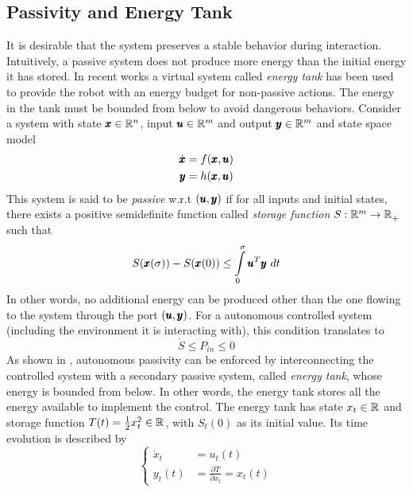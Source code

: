 \subsection{Passivity and Energy Tank}
It is desirable that the system preserves a stable behavior during interaction. Intuitively, a passive system does not produce more energy than the initial energy it has stored. In recent works \cite{shahriari2018valve} a virtual system called \emph{energy tank} has been used to provide the robot with an energy budget for non-passive actions. The energy in the tank must be bounded from below to avoid dangerous behaviors. Consider a system with state $\pmb{x} \in \mathbb{R}^{n}$, input $\pmb{u} \in \mathbb{R}^{m}$ and output $\pmb{y} \in \mathbb{R}^{m}$ and state space model
\begin{align}
\dot{\pmb{x}} &= f(\pmb{x}, \pmb{u}) \\
\pmb{y} &= h(\pmb{x}, \pmb{u})
\end{align}
This system is said to be \emph{passive} w.r.t $(\pmb{u},\pmb{y})$ if for all inputs and initial states, there exists a positive semidefinite function called \emph{storage function} $S: \mathbb{R}^{m} \rightarrow \mathbb{R}^{}_+$ such that 
\begin{equation}
    S(\pmb{x}(\sigma)) - S(\pmb{x}(0))\leq \int\limits_{0}^{\sigma} \pmb{u}^T \pmb{y}\ dt  
\end{equation}
In other words, no additional energy can be produced other than the one flowing to the system through the port $(\pmb{u},\pmb{y})$.
For a autonomous controlled system (including the environment it is interacting with), this condition translates to 
\begin{equation}
    \dot{S} \leq P_{in} \leq 0
\end{equation}
 As shown in \cite{shahriari2018valve}, autonomous passivity can be enforced by interconnecting the controlled system with a secondary passive system, called \emph{energy tank}, whose energy is bounded from below. In other words, the  energy tank stores all the energy available to implement the control. The energy tank has state $x_t \in \mathbb{R}^{}$ and storage function $T(t) = \frac{1}{2} x_t^2 \in \mathbb{R}^{}$, with $S_t(0)$ as its initial value. Its time evolution is described by
\begin{equation}
\begin{cases}
\dot{x}_t &= u_t(t) \\
y_t(t) &= \frac{\partial T}{\partial x_t} = x_t(t)
\end{cases}
\end{equation}

